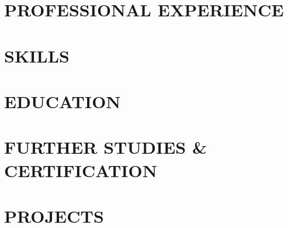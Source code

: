 \documentclass[12pt, letterpaper]{report}
\begin{document}
\onlineHeader
\vspace{-.8cm}
\section{\faBriefcase \space PROFESSIONAL EXPERIENCE}
\resumeSubHeadingList
\treon
\tampere
\nokia
\resumeSubHeadingListEnd
\vspace{-.8cm}
\newlength{\rowSpace}
\setlength{\rowSpace}{1.8mm}
\section{\faPuzzlePiece\space SKILLS}
\generalSkills
\vspace{-.6cm}
\section{\faGraduationCap\space EDUCATION}
\resumeSubHeadingList
\eduTampere
\eduNodet
\resumeSubHeadingListEnd
\section{\faBook\space FURTHER STUDIES \& CERTIFICATION}
\certGeneral
\pagebreak
\section{\faFolderOpen\space PROJECTS}
\projectJobSearch
\logLyfe
\secondSight
\blockChain
\rqm
\codeShare
\hyperLink
\end{document}
